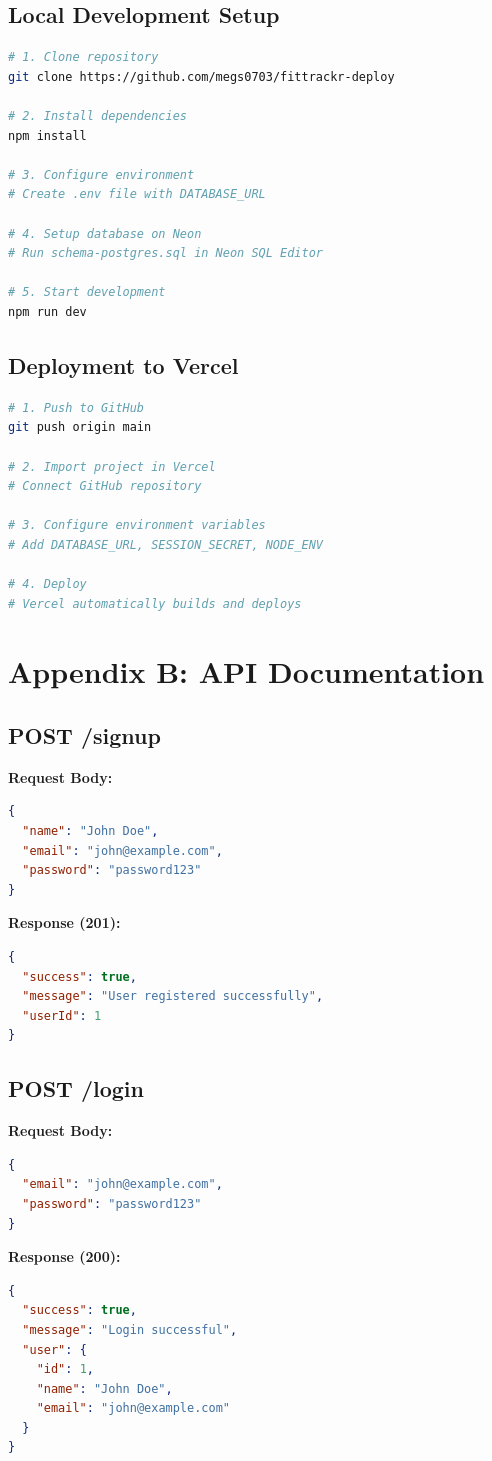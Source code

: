 \documentclass[12pt,a4paper]{article}
\begin{document}
\subsection{Local Development Setup}
\begin{lstlisting}[language=bash]
# 1. Clone repository
git clone https://github.com/megs0703/fittrackr-deploy

# 2. Install dependencies
npm install

# 3. Configure environment
# Create .env file with DATABASE_URL

# 4. Setup database on Neon
# Run schema-postgres.sql in Neon SQL Editor

# 5. Start development
npm run dev
\end{lstlisting}

\subsection{Deployment to Vercel}
\begin{lstlisting}[language=bash]
# 1. Push to GitHub
git push origin main

# 2. Import project in Vercel
# Connect GitHub repository

# 3. Configure environment variables
# Add DATABASE_URL, SESSION_SECRET, NODE_ENV

# 4. Deploy
# Vercel automatically builds and deploys
\end{lstlisting}

\section{Appendix B: API Documentation}

\subsection{POST /signup}
\textbf{Request Body:}
\begin{lstlisting}[language=json]
{
  "name": "John Doe",
  "email": "john@example.com",
  "password": "password123"
}
\end{lstlisting}

\textbf{Response (201):}
\begin{lstlisting}[language=json]
{
  "success": true,
  "message": "User registered successfully",
  "userId": 1
}
\end{lstlisting}

\subsection{POST /login}
\textbf{Request Body:}
\begin{lstlisting}[language=json]
{
  "email": "john@example.com",
  "password": "password123"
}
\end{lstlisting}

\textbf{Response (200):}
\begin{lstlisting}[language=json]
{
  "success": true,
  "message": "Login successful",
  "user": {
    "id": 1,
    "name": "John Doe",
    "email": "john@example.com"
  }
}
\end{lstlisting}
\end{document}
